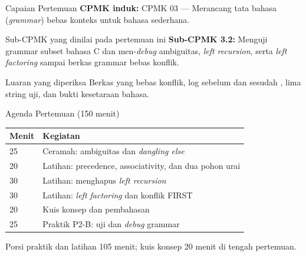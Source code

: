 \documentclass[aspectratio=169,10pt,t]{beamer}
\begin{document}

\begin{frame}{Capaian Pertemuan}
  \textbf{CPMK induk:} CPMK 03 --- Merancang tata bahasa
  (\textit{grammar}) bebas konteks untuk bahasa sederhana.

  \vspace{3pt}
  \begin{block}{Sub-CPMK yang dinilai pada pertemuan ini}
    \small
    \textbf{Sub-CPMK 3.2:} Menguji grammar subset bahasa C dan
    men-\textit{debug} ambiguitas, \textit{left recursion}, serta
    \textit{left factoring} sampai berkas grammar bebas konflik.
  \end{block}

  \vspace{3pt}
  \begin{exampleblock}{Luaran yang diperiksa}
    \footnotesize
    Berkas  yang bebas konflik, log sebelum dan
    sesudah , lima string uji, dan bukti kesetaraan bahasa.
  \end{exampleblock}
\end{frame}

\begin{frame}{Agenda Pertemuan (150 menit)}
  \small
  \begin{tabular}{@{}p{1.4cm}p{12.3cm}@{}}
    \toprule
    \textbf{Menit} & \textbf{Kegiatan} \\
    \midrule
    25 & Ceramah: ambiguitas dan \textit{dangling else} \\
    20 & Latihan: precedence, associativity, dan dua pohon urai \\
    30 & Latihan: menghapus \textit{left recursion} \\
    30 & Latihan: \textit{left factoring} dan konflik FIRST \\
    20 & Kuis konsep dan pembahasan \\
    25 & Praktik P2-B: uji dan \textit{debug} grammar \\
    \bottomrule
  \end{tabular}

  \vspace{6pt}
  {\scriptsize\color{ubbblue!75}Porsi praktik dan latihan 105 menit;
  kuis konsep 20 menit di tengah pertemuan.}
\end{frame}
\end{document}

